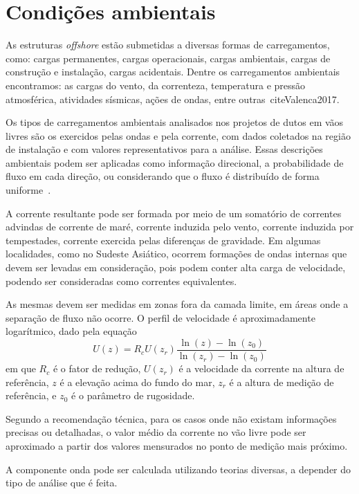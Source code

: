 \section{Condições ambientais}
\label{sec:condicoes-ambientais}

As estruturas \textit{offshore} estão submetidas a diversas formas de carregamentos, como: cargas permanentes, cargas operacionais, cargas ambientais, cargas de construção e instalação, cargas acidentais.
Dentre os carregamentos ambientais encontramos: as cargas do vento, da correnteza, temperatura e pressão atmosférica, atividades sísmicas, ações de ondas, entre outras~cite{Valenca2017}.

Os tipos de carregamentos ambientais analisados nos projetos de dutos em vãos livres são os exercidos pelas ondas e pela corrente, com dados coletados na região de instalação e com valores representativos para a análise.
Essas descrições ambientais podem ser aplicadas como informação direcional, a probabilidade de fluxo em cada direção, ou considerando que o fluxo é distribuído de forma uniforme~\cite{DNV2017}.

A corrente resultante pode ser formada por meio de um somatório de correntes advindas de corrente de maré, corrente induzida pelo vento, corrente induzida por tempestades, corrente exercida pelas diferenças de gravidade.
Em algumas localidades, como no Sudeste Asiático, ocorrem formações de ondas internas que devem ser levadas em consideração, pois podem conter alta carga de velocidade, podendo ser consideradas como correntes equivalentes.

As mesmas devem ser medidas em zonas fora da camada limite, em áreas onde a separação de fluxo não ocorre.
O perfil de velocidade é aproximadamente logarítmico, dado pela equação
\begin{equation}
\label{eq:viv-eq1}
U(z) = R_c U(z_r) \frac{\ln{(z)}- \ln(z_0)}{\ln (z_r)- \ln (z_0)}
\end{equation}
em que $R_c$ é o fator de redução, $U(z_r)$ é a velocidade da corrente na altura de referência, $z$ é a elevação acima do fundo do mar, $z_r$ é a altura de medição de referência, e $z_0$ é o parâmetro de rugosidade.

Segundo a recomendação técnica, para os casos onde não existam informações precisas ou detalhadas, o valor médio da corrente no vão livre pode ser aproximado a partir dos valores mensurados no ponto de medição mais próximo.

A componente onda pode ser calculada utilizando teorias diversas, a depender do tipo de análise que é feita.

